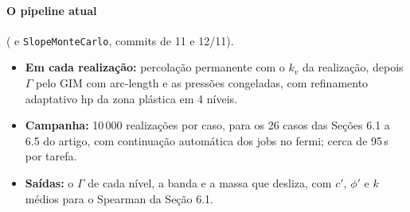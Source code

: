 \paragraph{O pipeline atual} ( e \texttt{SlopeMonteCarlo}, commits de 11 e 12/11).
\begin{itemize}
  \item \textbf{Em cada realização:} percolação permanente com o $k_v$ da realização, depois $\Gamma$ pelo GIM com
    arc-length e as pressões congeladas, com refinamento adaptativo hp da zona plástica em 4 níveis.
  \item \textbf{Campanha:} 10\,000 realizações por caso, para os 26 casos das Seções 6.1 a 6.5 do artigo, com
    continuação automática dos jobs no fermi; cerca de 95\,s por tarefa.
  \item \textbf{Saídas:} o $\Gamma$ de cada nível, a banda e a massa que desliza, com $c'$, $\phi'$ e $k$ médios para o
    Spearman da Seção 6.1.
\end{itemize}
